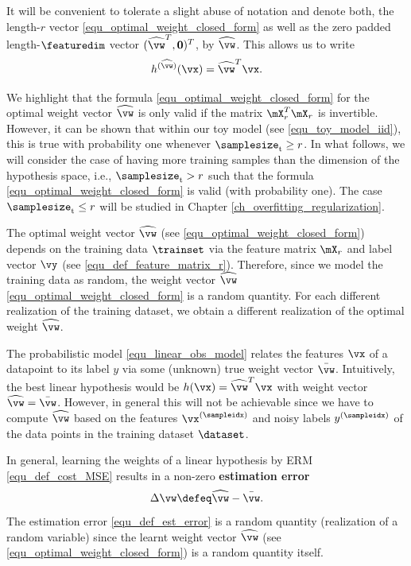 \documentclass[12pt]{report}
\begin{document}
It will be convenient to tolerate a slight abuse of notation and denote both, 
the length-$r$ vector \eqref{equ_optimal_weight_closed_form} as well as the zero 
padded length-$\featuredim$ vector $(\widehat{\vw}^{T},\mathbf{0})^{T}$, by $\widehat{\vw}$. 
This allows us to write %
\begin{equation} 
h^{(\widehat{\vw})}(\vx) = \widehat{\vw}^{T} \vx. 
\end{equation}

We highlight that the formula \eqref{equ_optimal_weight_closed_form} 
for the optimal weight vector $\widehat{\vw}$ is only valid if the matrix 
$\mX^{T}_{r} \mX_{r}$ is invertible. However, it can be shown that within 
our toy model (see \eqref{equ_toy_model_iid}), this is true with probability 
one whenever $\samplesize_{\rm t} \geq r$. In what follows, we will consider 
the case of having more training samples than the dimension of the 
hypothesis space, i.e., $\samplesize_{\rm t} > r$ such that the formula 
\eqref{equ_optimal_weight_closed_form} is valid (with probability one). 
The case $\samplesize_{\rm t} \leq r$ will be studied in Chapter \ref{ch_overfitting_regularization}.

The optimal weight vector $\widehat{\vw}$ (see \eqref{equ_optimal_weight_closed_form}) 
depends on the training data $\trainset$ via the feature matrix $\mX_{r}$ 
and label vector $\vy$ (see \eqref{equ_def_feature_matrix_r}). Therefore, 
since we model the training data as random, the weight vector $\widehat{\vw}$ 
\eqref{equ_optimal_weight_closed_form} is a random quantity. For each different 
realization of the training dataset, we obtain a different realization of the 
optimal weight $\widehat{\vw}$. 

The probabilistic model \eqref{equ_linear_obs_model} relates the features 
$\vx$ of a datapoint to its label $y$ via some (unknown) true weight vector $\bar{\vw}$. 
Intuitively, the best linear hypothesis would be $h(\vx) =\widehat{\vw}^{T} \vx$ with 
weight vector $\widehat{\vw} = \bar{\vw}$. However, in general this will not be 
achievable since we have to compute $\widehat{\vw}$ based on the features 
$\vx^{(\sampleidx)}$ and noisy labels $y^{(\sampleidx)}$ of the data 
points in the training dataset $\dataset$. 

In general, learning the weights of a linear hypothesis by ERM \eqref{equ_def_cost_MSE} 
results in a non-zero {\bf estimation error}
\begin{equation}
\label{equ_def_est_error}
\Delta \vw \defeq \widehat{\vw} - \bar{\vw}. 
\end{equation} 
The estimation error \eqref{equ_def_est_error} is a random quantity (realization of a random variable) 
since the learnt weight vector $\widehat{\vw}$ (see \eqref{equ_optimal_weight_closed_form}) 
is a random quantity itself.
\end{document}
